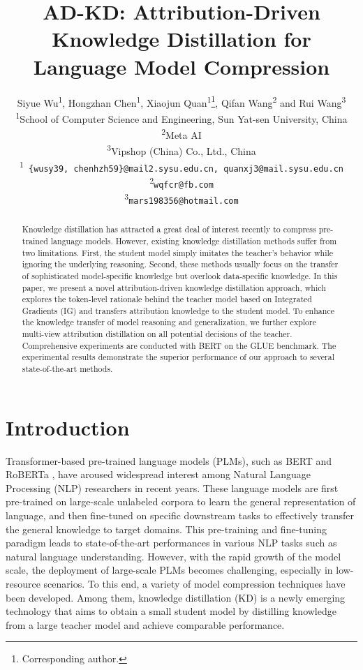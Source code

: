 \documentclass[11pt]{article}
\title{AD-KD: Attribution-Driven Knowledge Distillation for\\  Language Model Compression}
\author{Siyue Wu\textsuperscript{1}, Hongzhan Chen\textsuperscript{1}, Xiaojun Quan\textsuperscript{1}\thanks{\; Corresponding author.}, Qifan Wang\textsuperscript{2} and Rui Wang\textsuperscript{3} \\
  \textsuperscript{1}School of Computer Science and Engineering, Sun Yat-sen University, China \\
  \textsuperscript{2}Meta AI \\
  \textsuperscript{3}Vipshop (China) Co., Ltd., China \\
  \textsuperscript{1}\texttt{ \{wusy39, chenhzh59\}@mail2.sysu.edu.cn, quanxj3@mail.sysu.edu.cn}\\
  \textsuperscript{2}\texttt{wqfcr@fb.com} \\
  \textsuperscript{3}\texttt{mars198356@hotmail.com}}
\begin{document}
\maketitle
\begin{abstract}

Knowledge distillation has attracted a great deal of interest recently to compress pre-trained language models. However, existing knowledge distillation methods suffer from two limitations. First, the student model simply imitates the teacher's behavior while ignoring the underlying reasoning. Second, these methods usually focus on the transfer of sophisticated model-specific knowledge but overlook data-specific knowledge. In this paper, we present a novel attribution-driven knowledge distillation approach, which explores the token-level rationale behind the teacher model based on Integrated Gradients (IG) and transfers attribution knowledge to the student model. To enhance the knowledge transfer of model reasoning and generalization, we further explore multi-view attribution distillation on all potential decisions of the teacher. Comprehensive experiments are conducted with BERT on the GLUE benchmark. The experimental results demonstrate the superior performance of our approach to several state-of-the-art methods. 
\end{abstract}

\section{Introduction}

Transformer-based pre-trained language models (PLMs), such as BERT \citep{devlin-etal-2019-bert} and RoBERTa \citep{liu2019roberta}, have aroused widespread interest among Natural Language Processing (NLP) researchers in recent years. These language models are first pre-trained on large-scale unlabeled corpora to learn the general representation of language, and then fine-tuned on specific downstream tasks to effectively transfer the general knowledge to target domains. This pre-training and fine-tuning paradigm leads to state-of-the-art performances in various NLP tasks such as natural language understanding. However, with the rapid growth of the model scale, the deployment of large-scale PLMs becomes challenging, especially in low-resource scenarios. To this end, a variety of model compression techniques have been developed. Among them, knowledge distillation (KD) \citep{hinton2015distilling} is a newly emerging technology that aims to obtain a small student model by distilling knowledge from a large teacher model and achieve comparable performance.
\end{document}
